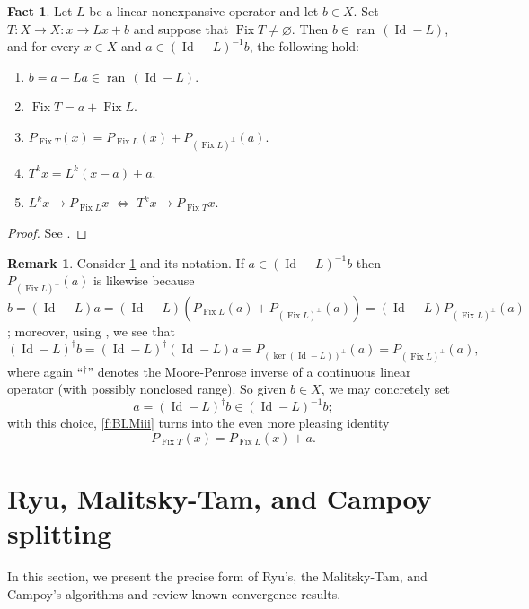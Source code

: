 \documentclass[11pt]{article}
\newcommand{\ran}{\ensuremath{{\operatorname{ran}}\,}}
\newcommand{\Fix}{\ensuremath{\operatorname{Fix}}}
\newcommand{\Id}{\ensuremath{\operatorname{Id}}}
\theoremstyle{definition}
\newtheorem{fact}[theorem]{Fact}
\newtheorem{remark}[theorem]{Remark}
\providecommand{\ran}{\operatorname{ran}}
\providecommand{\Id}{\operatorname{{ Id}}}
\providecommand{\ran}{\operatorname{ran}}
\providecommand{\Id}{\operatorname{Id}}
\begin{document}
{\begin{fact}
\label{f:BLM}
Let $L$ be a linear nonexpansive operator and let $b\in X$.
Set $T\colon X\to X\colon x\to Lx+b$ and suppose that 
$\Fix T\neq\varnothing$.
Then $b\in\ran(\Id-L)$, and for every $x\in X$ and
$a\in(\Id-L)^{-1}b$, the following hold:
\begin{enumerate}
\item $b=a-La\in\ran(\Id-L)$.
\item $\Fix T = a + \Fix L$.
\item 
\label{f:BLMiii}
$P_{\Fix T}(x) = P_{\Fix L}(x) + P_{(\Fix L)^\perp}(a)$.
\item $T^kx = L^k(x-a)+a$.
\item $L^kx \to P_{\Fix L}x$ $\Leftrightarrow$ $T^kx \to P_{\Fix T}x$. 
\end{enumerate}
\end{fact}
\begin{proof}
See \cite[Lemma~3.2 and Theorem~3.3]{BLM}. 
\end{proof}

\begin{remark}
\label{r:BLM}
Consider \cref{f:BLM} and its notation.
If $a\in(\Id-L)^{-1}b$ then 
$P_{(\Fix L)^\perp}(a)$ is likewise because 
$b = (\Id-L)a = (\Id-L)(P_{\Fix L}(a)+P_{(\Fix L)^\perp}(a))
=(\Id-L)P_{(\Fix L)^\perp}(a)$; moreover,
using \cite[Lemma~3.2.1]{Groetsch}, we see that 
\begin{equation*}
(\Id-L)^\dagger b 
=(\Id-L)^\dagger(\Id-L)a
=P_{(\ker(\Id-L))^\perp}(a)
=P_{(\Fix L)^\perp}(a),
\end{equation*}
where again ``$^\dagger$'' denotes the Moore-Penrose inverse of a continuous
linear operator (with possibly nonclosed range).
So given $b\in X$, we may concretely set 
\begin{equation*}
a = (\Id-L)^\dagger b \in (\Id-L)^{-1}b;
\end{equation*}
with this choice, \cref{f:BLMiii} turns into the even more pleasing identity
\begin{equation*}
P_{\Fix T}(x) = P_{\Fix L}(x) + a.
\end{equation*}
\end{remark}


\section{Ryu, Malitsky-Tam, and Campoy splitting }

In this section, we present the precise form of
Ryu's, the Malitsky-Tam, and Campoy's algorithms and review 
known convergence results. 

}
\end{document}
